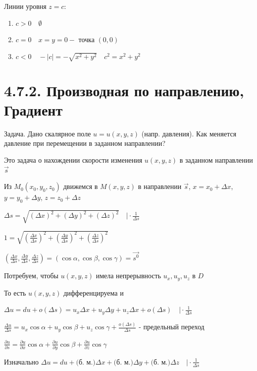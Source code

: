 \documentclass[12pt]{article}
\begin{document}
    Линии уровня $z = c$:

    \begin{enumerate}
        \item $c > 0 \quad \emptyset$
        \item $c = 0 \quad x = y = 0 - $ точка $(0, 0)$
        \item $c < 0 \quad -|c| = -\sqrt{x^2 + y^2} \quad c^2 = x^2 + y^2$
    \end{enumerate}


    \section{4.7.2. Производная по направлению, Градиент}

    Задача. Дано скалярное поле $u = u(x, y, z)$ (напр. давления). Как меняется давление при перемещении в заданном направлении?

    Это задача о нахождении скорости изменения $u(x, y, z)$ в заданном направлении $\overrightarrow{s}$

    Из $M_0(x_0, y_0, z_0)$ движемся в $M(x, y, z)$ в направлении $\overrightarrow{s}$, $x = x_0 + \Delta x$, $y = y_0 + \Delta y$, $z = z_0 + \Delta z$

    $\Delta s = \sqrt{(\Delta x)^2 + (\Delta y)^2 + (\Delta z)^2} \quad \Big| \cdot \frac{1}{\Delta s}$

    $1 = \sqrt{(\frac{\Delta x}{\Delta s})^2 + (\frac{\Delta y}{\Delta s})^2 + (\frac{\Delta z}{\Delta s})^2}$

    $(\frac{\Delta x}{\Delta s}, \frac{\Delta y}{\Delta s}, \frac{\Delta z}{\Delta s}) = (\cos\alpha, \cos\beta, \cos\gamma) = \overrightarrow{s^0}$

    Потребуем, чтобы $u(x, y, z)$ имела непрерывность $u_x, u_y, u_z$ в $D$

    То есть $u(x, y, z)$ дифференцируема и

    $\Delta u = du + o(\Delta s) = u_x \Delta x + u_y \Delta y + u_z \Delta x + o(\Delta s) \quad \Big| \cdot \frac{1}{\Delta s}$

    $\frac{\Delta u}{\Delta s} = u_x \cos\alpha + u_y \cos\beta + u_z \cos\gamma + \frac{o(\Delta s)}{\Delta s}$ - предельный переход

    $\frac{\partial u}{\partial s} = \frac{\partial u}{\partial x} \cos\alpha + \frac{\partial u}{\partial y} \cos\beta + \frac{\partial u}{\partial z} \cos\gamma$

    \Nota Изначально $\Delta u = du + \text{(б. м.)} \Delta x + \text{(б. м.)} \Delta y + \text{(б. м.)} \Delta z \quad \Big| \cdot \frac{1}{\Delta s}$
\end{document}
